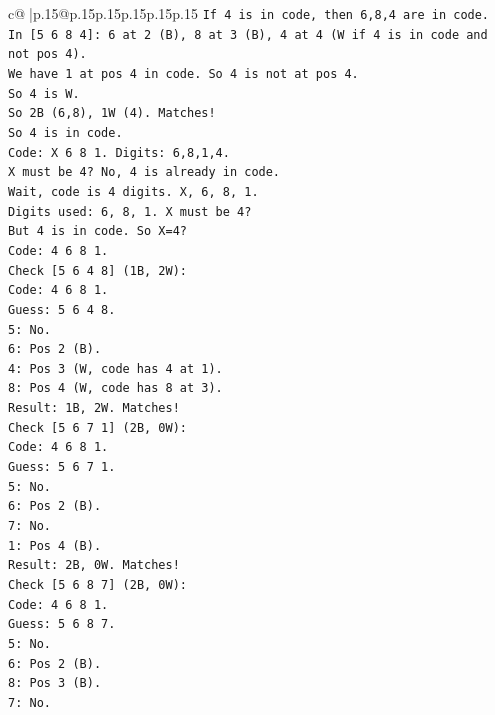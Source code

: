 \documentclass{article}
\begin{document}
{\begin{supertabular}{c@{$\;$}|p{.15\linewidth}@{}p{.15\linewidth}p{.15\linewidth}p{.15\linewidth}p{.15\linewidth}p{.15\linewidth}}
{{{\texttt{If 4 is in code, then 6,8,4 are in code.} \\
\texttt{In {[}5 6 8 4{]}: 6 at 2 (B), 8 at 3 (B), 4 at 4 (W if 4 is in code and not pos 4).} \\
\texttt{We have 1 at pos 4 in code. So 4 is not at pos 4.} \\
\texttt{So 4 is W.} \\
\texttt{So 2B (6,8), 1W (4). Matches!} \\
\texttt{So 4 is in code.} \\
\texttt{Code: X 6 8 1. Digits: 6,8,1,4.} \\
\texttt{X must be 4? No, 4 is already in code.} \\
\texttt{Wait, code is 4 digits. X, 6, 8, 1.} \\
\texttt{Digits used: 6, 8, 1. X must be 4?} \\
\texttt{But 4 is in code. So X=4?} \\
\texttt{Code: 4 6 8 1.} \\
\texttt{Check {[}5 6 4 8{]} (1B, 2W):} \\
\texttt{Code: 4 6 8 1.} \\
\texttt{Guess: 5 6 4 8.} \\
\texttt{5: No.} \\
\texttt{6: Pos 2 (B).} \\
\texttt{4: Pos 3 (W, code has 4 at 1).} \\
\texttt{8: Pos 4 (W, code has 8 at 3).} \\
\texttt{Result: 1B, 2W. Matches!} \\
\texttt{Check {[}5 6 7 1{]} (2B, 0W):} \\
\texttt{Code: 4 6 8 1.} \\
\texttt{Guess: 5 6 7 1.} \\
\texttt{5: No.} \\
\texttt{6: Pos 2 (B).} \\
\texttt{7: No.} \\
\texttt{1: Pos 4 (B).} \\
\texttt{Result: 2B, 0W. Matches!} \\
\texttt{Check {[}5 6 8 7{]} (2B, 0W):} \\
\texttt{Code: 4 6 8 1.} \\
\texttt{Guess: 5 6 8 7.} \\
\texttt{5: No.} \\
\texttt{6: Pos 2 (B).} \\
\texttt{8: Pos 3 (B).} \\
\texttt{7: No.} \\
}}}
\end{supertabular}}
\end{document}
